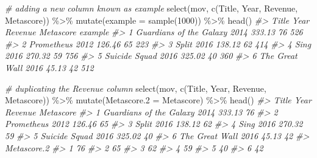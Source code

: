 \documentclass[
]{book}
\newenvironment{Shaded}{\begin{snugshade}}{\end{snugshade}}
\newcommand{\AttributeTok}[1]{\textcolor[rgb]{0.77,0.63,0.00}{#1}}
\newcommand{\CommentTok}[1]{\textcolor[rgb]{0.56,0.35,0.01}{\textit{#1}}}
\newcommand{\DecValTok}[1]{\textcolor[rgb]{0.00,0.00,0.81}{#1}}
\newcommand{\FunctionTok}[1]{\textcolor[rgb]{0.00,0.00,0.00}{#1}}
\newcommand{\NormalTok}[1]{#1}
\newcommand{\SpecialCharTok}[1]{\textcolor[rgb]{0.00,0.00,0.00}{#1}}
\newcommand{\StringTok}[1]{\textcolor[rgb]{0.31,0.60,0.02}{#1}}
\begin{document}
\begin{Shaded}
\begin{Highlighting}[]
\CommentTok{\# adding a new column known as example}
\FunctionTok{select}\NormalTok{(mov, }\FunctionTok{c}\NormalTok{(}\StringTok{\textquotesingle{}Title\textquotesingle{}}\NormalTok{, }\StringTok{\textquotesingle{}Year\textquotesingle{}}\NormalTok{, }\StringTok{\textquotesingle{}Revenue\textquotesingle{}}\NormalTok{, }\StringTok{\textquotesingle{}Metascore\textquotesingle{}}\NormalTok{)) }\SpecialCharTok{\%\textgreater{}\%}
\FunctionTok{mutate}\NormalTok{(}\AttributeTok{example =} \FunctionTok{sample}\NormalTok{(}\DecValTok{1000}\NormalTok{)) }\SpecialCharTok{\%\textgreater{}\%}
  \FunctionTok{head}\NormalTok{()}
\CommentTok{\#\textgreater{}                     Title Year Revenue Metascore example}
\CommentTok{\#\textgreater{} 1 Guardians of the Galaxy 2014  333.13        76     526}
\CommentTok{\#\textgreater{} 2              Prometheus 2012  126.46        65     223}
\CommentTok{\#\textgreater{} 3                   Split 2016  138.12        62     414}
\CommentTok{\#\textgreater{} 4                    Sing 2016  270.32        59     756}
\CommentTok{\#\textgreater{} 5           Suicide Squad 2016  325.02        40     360}
\CommentTok{\#\textgreater{} 6          The Great Wall 2016   45.13        42     512}

\CommentTok{\# duplicating the Revenue column}
\FunctionTok{select}\NormalTok{(mov, }\FunctionTok{c}\NormalTok{(}\StringTok{\textquotesingle{}Title\textquotesingle{}}\NormalTok{, }\StringTok{\textquotesingle{}Year\textquotesingle{}}\NormalTok{, }\StringTok{\textquotesingle{}Revenue\textquotesingle{}}\NormalTok{, }\StringTok{\textquotesingle{}Metascore\textquotesingle{}}\NormalTok{)) }\SpecialCharTok{\%\textgreater{}\%}
\FunctionTok{mutate}\NormalTok{(}\AttributeTok{Metascore.2 =}\NormalTok{ Metascore) }\SpecialCharTok{\%\textgreater{}\%}
  \FunctionTok{head}\NormalTok{()}
\CommentTok{\#\textgreater{}                     Title Year Revenue Metascore}
\CommentTok{\#\textgreater{} 1 Guardians of the Galaxy 2014  333.13        76}
\CommentTok{\#\textgreater{} 2              Prometheus 2012  126.46        65}
\CommentTok{\#\textgreater{} 3                   Split 2016  138.12        62}
\CommentTok{\#\textgreater{} 4                    Sing 2016  270.32        59}
\CommentTok{\#\textgreater{} 5           Suicide Squad 2016  325.02        40}
\CommentTok{\#\textgreater{} 6          The Great Wall 2016   45.13        42}
\CommentTok{\#\textgreater{}   Metascore.2}
\CommentTok{\#\textgreater{} 1          76}
\CommentTok{\#\textgreater{} 2          65}
\CommentTok{\#\textgreater{} 3          62}
\CommentTok{\#\textgreater{} 4          59}
\CommentTok{\#\textgreater{} 5          40}
\CommentTok{\#\textgreater{} 6          42}


\end{Highlighting}
\end{Shaded}
\end{document}
